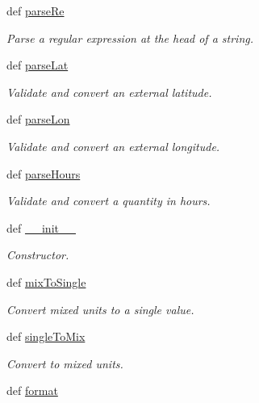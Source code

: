 \begin{DoxyCompactItemize}
def \hyperlink{namespaceamonpy_1_1sim_1_1sidereal__m_ab2a3f6edae3ab87ecd9f350194e535f2}{parse\-Re}
\begin{DoxyCompactList}\small\item\em Parse a regular expression at the head of a string. \end{DoxyCompactList}\item 
def \hyperlink{namespaceamonpy_1_1sim_1_1sidereal__m_a74f7feb5a8a7869732a3c693fc1c8f0e}{parse\-Lat}
\begin{DoxyCompactList}\small\item\em Validate and convert an external latitude. \end{DoxyCompactList}\item 
def \hyperlink{namespaceamonpy_1_1sim_1_1sidereal__m_aedab2db38ee08dc0fc419c43056aa26e}{parse\-Lon}
\begin{DoxyCompactList}\small\item\em Validate and convert an external longitude. \end{DoxyCompactList}\item 
def \hyperlink{namespaceamonpy_1_1sim_1_1sidereal__m_a618bdb27a8733066f4ded6c6890a995c}{parse\-Hours}
\begin{DoxyCompactList}\small\item\em Validate and convert a quantity in hours. \end{DoxyCompactList}\item 
def \hyperlink{namespaceamonpy_1_1sim_1_1sidereal__m_a2159885c957afafb8f99301627008fd7}{\-\_\-\-\_\-init\-\_\-\-\_\-}
\begin{DoxyCompactList}\small\item\em Constructor. \end{DoxyCompactList}\item 
def \hyperlink{namespaceamonpy_1_1sim_1_1sidereal__m_a148e35b70d501802a54fab09657953aa}{mix\-To\-Single}
\begin{DoxyCompactList}\small\item\em Convert mixed units to a single value. \end{DoxyCompactList}\item 
def \hyperlink{namespaceamonpy_1_1sim_1_1sidereal__m_a5bcf75309fefa0605b8c62398cc0cfe9}{single\-To\-Mix}
\begin{DoxyCompactList}\small\item\em Convert to mixed units. \end{DoxyCompactList}\item 
def \hyperlink{namespaceamonpy_1_1sim_1_1sidereal__m_ab07699ca6defb620cc505812e69d3740}{format}

\end{DoxyCompactItemize}
